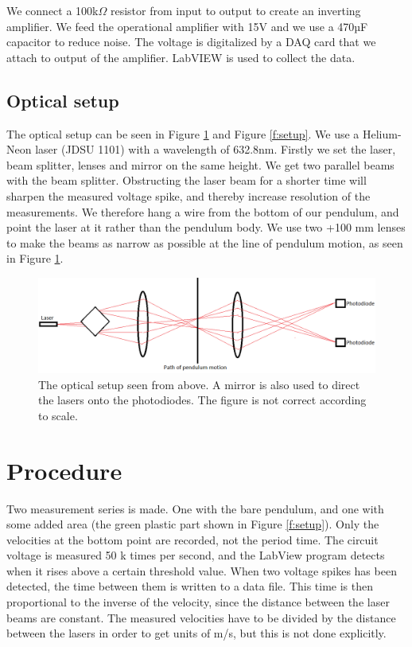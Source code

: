 \documentclass[11pt, a4paper]{article}
\begin{document}
We connect a 100k$\Omega$ resistor from input to output to create an inverting amplifier. 
We feed the operational amplifier with 15V and we use a 470µF capacitor to reduce 
noise. The voltage is digitalized by a DAQ card that we attach to output of the 
amplifier. LabVIEW is used to collect the data.

\subsection{Optical setup}
\label{s:Optical setup}
The optical setup can be seen in Figure \ref{f:opticalsetup} and Figure \ref{f:setup}. 
We use a Helium-Neon 
laser (JDSU 1101) with a wavelength of 632.8nm. Firstly we set the laser, beam 
splitter, lenses and mirror on the same height. We get two parallel beams with the 
beam splitter. 
Obstructing the laser beam for a shorter time will sharpen the measured voltage spike, and thereby increase resolution of the measurements. 
We therefore hang a wire from the bottom of our pendulum, and point the laser at it rather than the pendulum body. 
We use two +100 mm lenses to make the beams as narrow as possible at the line of pendulum motion, as seen in Figure \ref{f:opticalsetup}.

\begin{figure}[h]
	\centering
	\includegraphics[scale=0.4]{opticalsetup2}
	\caption{The optical setup seen from above. A mirror is also used to direct the 
  lasers onto the photodiodes. The figure is not correct according to scale.}
	\label{f:opticalsetup}
\end{figure}

\section{Procedure}
Two measurement series is made. 
One with the bare pendulum, and one with some added area (the green plastic part shown in Figure \ref{f:setup}).
Only the velocities at the bottom point are recorded, not the period time.
The circuit voltage is measured 50 k times per second, and the LabView program detects when it rises above a certain threshold value.
When two voltage spikes has been detected, the time between them is written to a data file.
This time is then proportional to the inverse of the velocity, since the distance between the laser beams are constant.
The measured velocities have to be divided by the distance between the lasers in order to get units of m/s, but this is not done explicitly.
\end{document}
